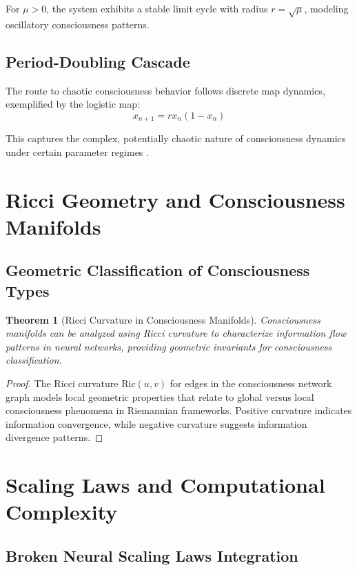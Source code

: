 \documentclass[11pt,a4paper]{article}
\newtheorem{theorem}{Theorem}
\begin{document}
For $\mu > 0$, the system exhibits a stable limit cycle with radius $r = \sqrt{\mu}$, modeling oscillatory consciousness patterns.

\subsection{Period-Doubling Cascade}
The route to chaotic consciousness behavior follows discrete map dynamics, exemplified by the logistic map:
\begin{equation}
x_{n+1} = rx_n(1-x_n)
\end{equation}

This captures the complex, potentially chaotic nature of consciousness dynamics under certain parameter regimes \cite{strogatz2018nonlinear,guckenheimer2013nonlinear}.

\section{Ricci Geometry and Consciousness Manifolds}

\subsection{Geometric Classification of Consciousness Types}

\begin{theorem}[Ricci Curvature in Consciousness Manifolds]
Consciousness manifolds can be analyzed using Ricci curvature to characterize information flow patterns in neural networks, providing geometric invariants for consciousness classification.
\end{theorem}

\begin{proof}
The Ricci curvature $\text{Ric}(u,v)$ for edges in the consciousness network graph models local geometric properties that relate to global versus local consciousness phenomena in Riemannian frameworks. Positive curvature indicates information convergence, while negative curvature suggests information divergence patterns.
\end{proof}

\section{Scaling Laws and Computational Complexity}

\subsection{Broken Neural Scaling Laws Integration}
\end{document}
